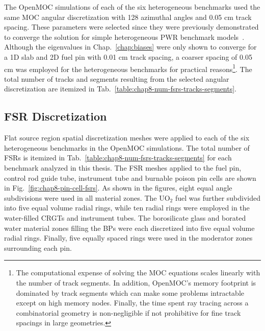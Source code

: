 The OpenMOC simulations of each of the six heterogeneous benchmarks used the same \ac{MOC} angular discretization with 128 azimuthal angles and 0.05 cm track spacing. These parameters were selected since they were previously demonstrated to converge the solution for simple heterogeneous \ac{PWR} benchmark models~\cite{boyd2014ms}. Although the eigenvalues in Chap.~\ref{chap:biases} were only shown to converge for a 1D slab and 2D fuel pin with 0.01 cm track spacing, a coarser spacing of 0.05 cm was employed for the heterogeneous benchmarks for practical reasons\footnote{The computational expense of solving the \ac{MOC} equations scales linearly with the number of track segments. In addition, OpenMOC's memory footprint is dominated by track segments which can make some problems intractable except on high memory nodes. Finally, the time spent ray tracing across a combinatorial geometry is non-negligible if not prohibitive for fine track spacings in large geometries.}. The total number of tracks and segments resulting from the selected angular discretization are itemized in Tab.~\ref{table:chap8-num-fsrs-tracks-segments}. 

\subsection{FSR Discretization}
\label{subsec:chap8-fsr-discretizations}

Flat source region spatial discretization meshes were applied to each of the six heterogeneous benchmarks in the OpenMOC simulations. The total number of \ac{FSR}s is itemized in Tab.~\ref{table:chap8-num-fsrs-tracks-segments} for each benchmark analyzed in this thesis. The \ac{FSR} meshes applied to the fuel pin, control rod guide tube, instrument tube and burnable poison pin cells are shown in Fig.~\ref{fig:chap8-pin-cell-fsrs}. As shown in the figures, eight equal angle subdivisions were used in all material zones. The UO$_2$ fuel was further subdivided into five equal volume radial rings, while ten radial rings were employed in the water-filled \acp{CRGT} and instrument tubes. The borosilicate glass and borated water material zones filling the \acp{BP} were each discretized into five equal volume radial rings. Finally, five equally spaced rings were used in the moderator zones surrounding each pin.


